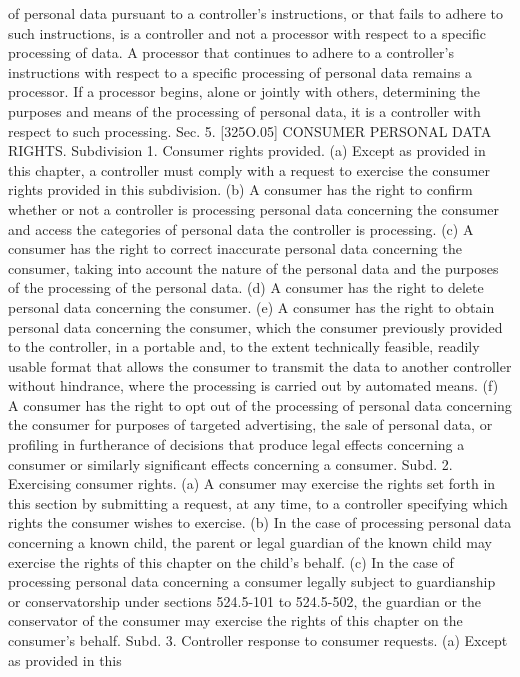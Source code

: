 of personal data pursuant to a controller's instructions, or that fails to adhere to such
instructions, is a controller and not a processor with respect to a specific processing of data.
A processor that continues to adhere to a controller's instructions with respect to a specific
processing of personal data remains a processor. If a processor begins, alone or jointly with
others, determining the purposes and means of the processing of personal data, it is a
controller with respect to such processing.
Sec. 5. [325O.05] CONSUMER PERSONAL DATA RIGHTS.
Subdivision 1. Consumer rights provided. (a) Except as provided in this chapter, a
controller must comply with a request to exercise the consumer rights provided in this
subdivision.
(b) A consumer has the right to confirm whether or not a controller is processing personal
data concerning the consumer and access the categories of personal data the controller is
processing.
(c) A consumer has the right to correct inaccurate personal data concerning the consumer,
taking into account the nature of the personal data and the purposes of the processing of the
personal data.
(d) A consumer has the right to delete personal data concerning the consumer.
(e) A consumer has the right to obtain personal data concerning the consumer, which
the consumer previously provided to the controller, in a portable and, to the extent technically
feasible, readily usable format that allows the consumer to transmit the data to another
controller without hindrance, where the processing is carried out by automated means.
(f) A consumer has the right to opt out of the processing of personal data concerning
the consumer for purposes of targeted advertising, the sale of personal data, or profiling in
furtherance of decisions that produce legal effects concerning a consumer or similarly
significant effects concerning a consumer.
Subd. 2. Exercising consumer rights. (a) A consumer may exercise the rights set forth
in this section by submitting a request, at any time, to a controller specifying which rights
the consumer wishes to exercise.
(b) In the case of processing personal data concerning a known child, the parent or legal
guardian of the known child may exercise the rights of this chapter on the child's behalf.
(c) In the case of processing personal data concerning a consumer legally subject to
guardianship or conservatorship under sections 524.5-101 to 524.5-502, the guardian or the
conservator of the consumer may exercise the rights of this chapter on the consumer's behalf.
Subd. 3. Controller response to consumer requests. (a) Except as provided in this
